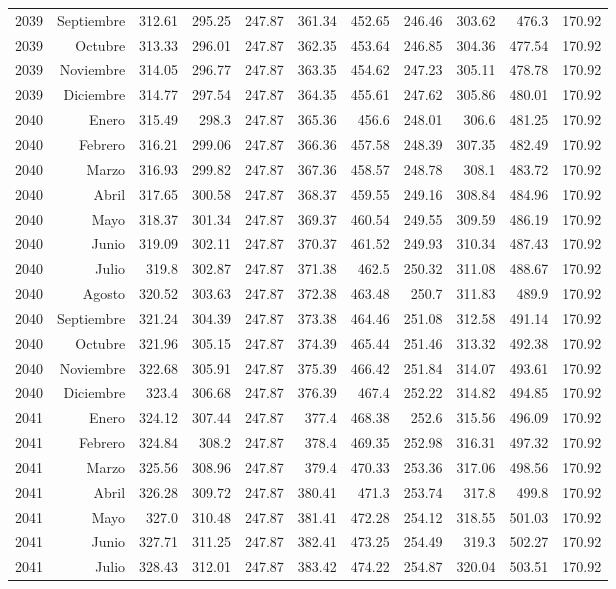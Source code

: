 \documentclass{article}%
\begin{document}
\begin{longtable}{|l r|r|r|r|r|r|r|r|r|r|}
2039&Septiembre&312.61&295.25&247.87&361.34&452.65&246.46&303.62&476.3&170.92\\%
2039&Octubre&313.33&296.01&247.87&362.35&453.64&246.85&304.36&477.54&170.92\\%
2039&Noviembre&314.05&296.77&247.87&363.35&454.62&247.23&305.11&478.78&170.92\\%
2039&Diciembre&314.77&297.54&247.87&364.35&455.61&247.62&305.86&480.01&170.92\\%
2040&Enero&315.49&298.3&247.87&365.36&456.6&248.01&306.6&481.25&170.92\\%
2040&Febrero&316.21&299.06&247.87&366.36&457.58&248.39&307.35&482.49&170.92\\%
2040&Marzo&316.93&299.82&247.87&367.36&458.57&248.78&308.1&483.72&170.92\\%
2040&Abril&317.65&300.58&247.87&368.37&459.55&249.16&308.84&484.96&170.92\\%
2040&Mayo&318.37&301.34&247.87&369.37&460.54&249.55&309.59&486.19&170.92\\%
2040&Junio&319.09&302.11&247.87&370.37&461.52&249.93&310.34&487.43&170.92\\%
2040&Julio&319.8&302.87&247.87&371.38&462.5&250.32&311.08&488.67&170.92\\%
2040&Agosto&320.52&303.63&247.87&372.38&463.48&250.7&311.83&489.9&170.92\\%
2040&Septiembre&321.24&304.39&247.87&373.38&464.46&251.08&312.58&491.14&170.92\\%
2040&Octubre&321.96&305.15&247.87&374.39&465.44&251.46&313.32&492.38&170.92\\%
2040&Noviembre&322.68&305.91&247.87&375.39&466.42&251.84&314.07&493.61&170.92\\%
2040&Diciembre&323.4&306.68&247.87&376.39&467.4&252.22&314.82&494.85&170.92\\%
2041&Enero&324.12&307.44&247.87&377.4&468.38&252.6&315.56&496.09&170.92\\%
2041&Febrero&324.84&308.2&247.87&378.4&469.35&252.98&316.31&497.32&170.92\\%
2041&Marzo&325.56&308.96&247.87&379.4&470.33&253.36&317.06&498.56&170.92\\%
2041&Abril&326.28&309.72&247.87&380.41&471.3&253.74&317.8&499.8&170.92\\%
2041&Mayo&327.0&310.48&247.87&381.41&472.28&254.12&318.55&501.03&170.92\\%
2041&Junio&327.71&311.25&247.87&382.41&473.25&254.49&319.3&502.27&170.92\\%
2041&Julio&328.43&312.01&247.87&383.42&474.22&254.87&320.04&503.51&170.92\\%

\end{longtable}
\end{document}
